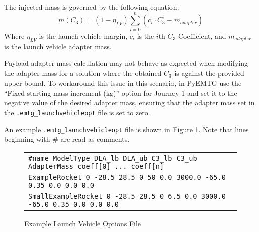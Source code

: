 \flushleft The injected mass is governed by the following equation:
\begin{equation}
    m(C_3) = (1 - \eta_{LV})\sum_{i=0}^{n}\left(c_i \cdot C_3^{i} - m_{adapter}\right)
    \label{eq:lv_injected_mass}
\end{equation}
Where $\eta_{LV}$ is the launch vehicle margin, $c_i$ is the $i$th $C_3$ Coefficient, and $m_{adapter}$ is the launch vehicle adapter mass.


\begin{alertbox}{}
    \noindent Payload adapter mass calculation may not behave as expected when modifying the adapter mass for a solution where the obtained $C_3$ is against the provided upper bound. To workaround this issue in this scenario, in PyEMTG use the ``Fixed starting mass increment (kg)'' option for Journey 1 and set it to the negative value of the desired adapter mass, ensuring that the adapter mass set in the {\tt .emtg\_launchvehicleopt} file is set to zero.
\end{alertbox}


An example {\tt .emtg\_launchvehicleopt} file is shown in Figure \ref{fig:config_launchvehicleopt}. Note that lines beginning with \# are read as comments.

\begin{figure}[htb]
    \centering
    \begin{tabular}{|l|}
        \hline
        {\tt \#name ModelType \ac{DLA}\_lb \ac{DLA}\_ub C3\_lb C3\_ub AdapterMass coeff[0] ... coeff[n]} \\
        {\tt ExampleRocket 0 -28.5 28.5 0 50 0.0 3000.0 -65.0 0.35 0.0 0.0 0.0} \\
        {\tt SmallExampleRocket 0 -28.5 28.5 0 6.5 0.0 3000.0 -65.0 0.35 0.0 0.0 0.0} \\
        \hline
    \end{tabular}
    \caption{Example Launch Vehicle Options File}
    \label{fig:config_launchvehicleopt}
\end{figure}